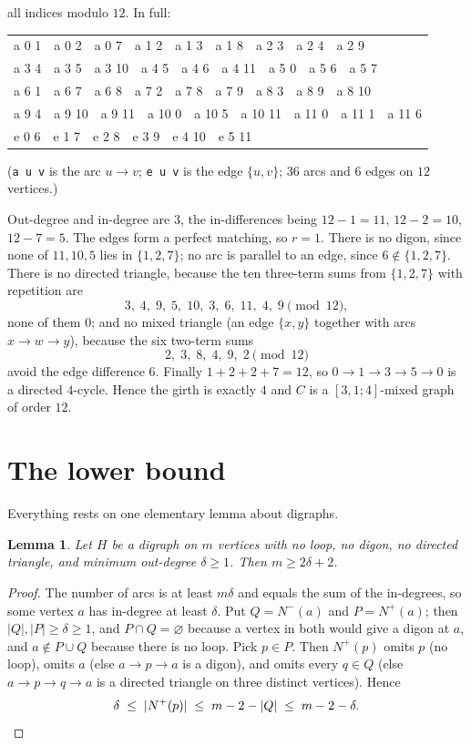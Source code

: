 \documentclass[11pt]{amsart}
\newtheorem{lemma}[theorem]{Lemma}
\theoremstyle{remark}
\begin{document}
all indices modulo $12$. In full:

\begin{center}\ttfamily\small
\begin{tabular}{l}
a 0 1\ \ a 0 2\ \ a 0 7\ \ a 1 2\ \ a 1 3\ \ a 1 8\ \ a 2 3\ \ a 2 4\ \ a 2 9\\
a 3 4\ \ a 3 5\ \ a 3 10\ \ a 4 5\ \ a 4 6\ \ a 4 11\ \ a 5 0\ \ a 5 6\ \ a 5 7\\
a 6 1\ \ a 6 7\ \ a 6 8\ \ a 7 2\ \ a 7 8\ \ a 7 9\ \ a 8 3\ \ a 8 9\ \ a 8 10\\
a 9 4\ \ a 9 10\ \ a 9 11\ \ a 10 0\ \ a 10 5\ \ a 10 11\ \ a 11 0\ \ a 11 1\ \ a 11 6\\[2pt]
e 0 6\ \ e 1 7\ \ e 2 8\ \ e 3 9\ \ e 4 10\ \ e 5 11
\end{tabular}
\end{center}

\noindent(\texttt{a u v} is the arc $u\to v$; \texttt{e u v} is the edge
$\{u,v\}$; $36$ arcs and $6$ edges on $12$ vertices.)

Out-degree and in-degree are $3$, the in-differences
being $12-1=11$, $12-2=10$, $12-7=5$. The edges form a perfect matching, so
$r=1$. There is no digon, since none of $11,10,5$ lies in $\{1,2,7\}$; no arc is
parallel to an edge, since $6\notin\{1,2,7\}$. There is no directed triangle,
because the ten three-term sums from $\{1,2,7\}$ with repetition are
\[
 3,\;4,\;9,\;5,\;10,\;3,\;6,\;11,\;4,\;9 \pmod{12},
\]
none of them $0$; and no mixed triangle (an edge $\{x,y\}$ together with arcs
$x\to w\to y$), because the six two-term sums
\[
 2,\;3,\;8,\;4,\;9,\;2 \pmod{12}
\]
avoid the edge difference $6$. Finally $1+2+2+7=12$, so $0\to1\to3\to5\to0$ is a
directed $4$-cycle. Hence the girth is exactly $4$ and $C$ is a
$[3,1;4]$-mixed graph of order $12$.

\section{The lower bound}

Everything rests on one elementary lemma about digraphs.

\begin{lemma}\label{lem:L}
Let $H$ be a digraph on $m$ vertices with no loop, no digon, no directed
triangle, and minimum out-degree $\delta\ge1$. Then $m\ge 2\delta+2$.
\end{lemma}

\begin{proof}
The number of arcs is at least $m\delta$ and equals the sum of the in-degrees,
so some vertex $a$ has in-degree at least $\delta$. Put $Q=N^-(a)$ and
$P=N^+(a)$; then $|Q|,|P|\ge\delta\ge1$, and $P\cap Q=\varnothing$ because a
vertex in both would give a digon at $a$, and $a\notin P\cup Q$ because there is
no loop. Pick $p\in P$. Then $N^+(p)$ omits $p$ (no loop), omits $a$ (else
$a\to p\to a$ is a digon), and omits every $q\in Q$ (else $a\to p\to q\to a$ is
a directed triangle on three distinct vertices). Hence
\[
 \delta\;\le\;|N^+(p)|\;\le\;m-2-|Q|\;\le\;m-2-\delta . \qedhere
\]
\end{proof}
\end{document}

